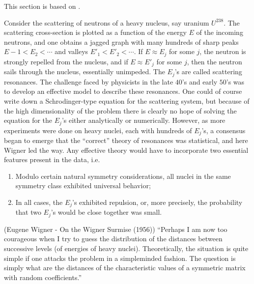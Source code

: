 This section is based on \cite{deift2006universalitymathematicalphysicalsystems}. 

Consider the scattering of neutrons of a heavy nucleus, say uranium $U^{238}$. The scattering cross-section is plotted as a function of the energy $E$ of the incoming neutrons, and one obtains a jagged graph with many hundreds of sharp peaks $E-1 < E_2 < \cdots$  and valleys $E'_1 < E'_2 < \cdots $. If $E \approx E_j$ for some $j$, the neutron is strongly repelled from the nucleus, and if $E \approx E'_j$ for some $j$, then the neutron sails through the nucleus, essentially unimpeded. The $E_j$’s are called scattering resonances. The challenge faced by physicists in the late $40$’s and early $50$’s was to develop an effective model to describe these resonances. One could of course write down a Schrodinger-type equation for the scattering system, but because of the high dimensionality of the problem there is clearly no hope of solving the equation for the $E_j$’s either analytically or numerically. However, as more experiments were done on heavy nuclei, each with hundreds of $E_j$’s, a consensus began to emerge that the “correct” theory of resonances was statistical, and here Wigner led the way. Any effective theory would have to incorporate two essential features present in the data, i.e.
\begin{enumerate}
	\item Modulo certain natural symmetry considerations, all nuclei in the same symmetry class exhibited universal behavior;
	\item In all cases, the $E_j$’s exhibited repulsion, or, more precisely, the probability that two $E_j$’s would be close together was small. 
\end{enumerate}

\begin{sic}
	(Eugene Wigner - On the Wigner Surmise (1956))
	“Perhaps I am now too courageous when I try to guess the distribution of the distances between successive levels (of energies of heavy nuclei). Theoretically, the situation is quite simple if one attacks the problem in a simpleminded fashion. The question is simply what are the distances of the characteristic values of a symmetric matrix with random coefficients.” 
\end{sic}

